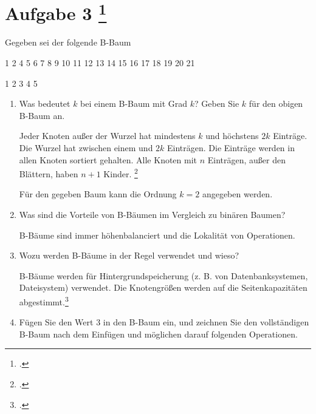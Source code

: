 \documentclass{lehramt-informatik-aufgabe}
\begin{document}
\liAufgabenTitel{}
\section{Aufgabe 3
\footcite{66116:2013:03}}

Gegeben sei der folgende B-Baum

1 2 4 5 6 7 8 9 10 11 12 13 14 15 16 17 18 19 20 21

1 2 3 4 5

\begin{enumerate}


\item Was bedeutet $k$ bei einem B-Baum mit Grad $k$? Geben Sie $k$ für
den obigen B-Baum an.

\begin{liAntwort}
Jeder Knoten außer der Wurzel hat mindestens $k$ und höchstens $2k$
Einträge. Die Wurzel hat zwischen einem und $2k$ Einträgen. Die Einträge
werden in allen Knoten sortiert gehalten. Alle Knoten mit $n$ Einträgen,
außer den Blättern, haben $n + 1$ Kinder.
\footcite[Seite 225]{kemper}

Für den gegeben Baum kann die Ordnung $k = 2$ angegeben werden.
\end{liAntwort}


\item Was sind die Vorteile von B-Bäumen im Vergleich zu binären Baumen?

\begin{liAntwort}
B-Bäume sind immer höhenbalanciert und  die  Lokalität
von Operationen.
\end{liAntwort}


\item Wozu werden B-Bäume in der Regel verwendet und wieso?

\begin{liAntwort}
B-Bäume werden für Hintergrundspeicherung (z. B. von Datenbanksystemen,
Dateisystem) verwendet. Die Knotengrößen werden auf die
Seitenkapazitäten abgestimmt.\footcite[Seite 223]{kemper}
\end{liAntwort}


\item Fügen Sie den Wert 3 in den B-Baum ein, und zeichnen Sie den
vollständigen B-Baum nach dem Einfügen und möglichen darauf folgenden
Operationen.


\end{enumerate}
\end{document}
